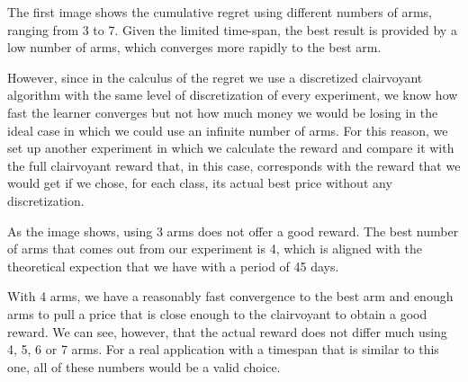 
The first image shows the cumulative regret using different numbers of arms, ranging from 3 to 7.
Given the limited time-span, the best result is provided by a low number of arms, which converges more rapidly to the best arm.

However, since in the calculus of the regret we use a discretized clairvoyant algorithm with the same level of discretization of every experiment, we know how fast the learner converges but not how much money we would be losing in the ideal case in which we could use an infinite number of arms. For this reason, we set up another experiment in which we calculate the reward and compare it with the full clairvoyant reward that, in this case, corresponds with the reward that we would get if we chose, for each class, its actual best price without any discretization.

As the image shows, using 3 arms does not offer a good reward. The best number of arms that comes out from our experiment is 4, which is aligned with the theoretical expection that we have with a period of 45 days.

With 4 arms, we have a reasonably fast convergence to the best arm and enough arms to pull a price that is close enough to the clairvoyant to obtain a good reward.
We can see, however, that the actual reward does not differ much using 4, 5, 6 or 7 arms. For a real application with a timespan that is similar to this one, all of these numbers would be a valid choice.